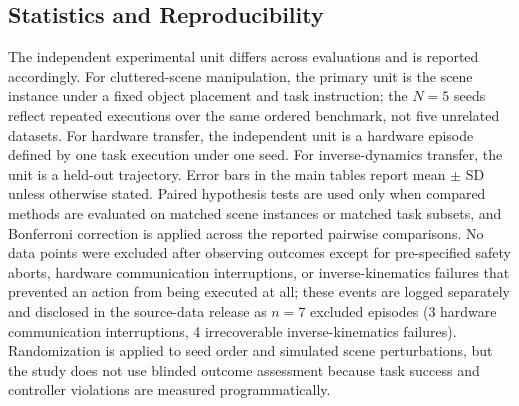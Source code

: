 \documentclass[12pt]{article}
\begin{document}
\begin{table}[!htbp]
\centering
\caption{Computational cost comparison (inference on NVIDIA RTX 4090).}
\label{tab:compute}
\small\setlength{\tabcolsep}{3pt}
\end{table}

\subsection{Statistics and Reproducibility}

The independent experimental unit differs across evaluations and is reported accordingly. For cluttered-scene manipulation, the primary unit is the scene instance under a fixed object placement and task instruction; the $N=5$ seeds reflect repeated executions over the same ordered benchmark, not five unrelated datasets. For hardware transfer, the independent unit is a hardware episode defined by one task execution under one seed. For inverse-dynamics transfer, the unit is a held-out trajectory. Error bars in the main tables report mean $\pm$ SD unless otherwise stated. Paired hypothesis tests are used only when compared methods are evaluated on matched scene instances or matched task subsets, and Bonferroni correction is applied across the reported pairwise comparisons. No data points were excluded after observing outcomes except for pre-specified safety aborts, hardware communication interruptions, or inverse-kinematics failures that prevented an action from being executed at all; these events are logged separately and disclosed in the source-data release as $n=7$ excluded episodes (3 hardware communication interruptions, 4 irrecoverable inverse-kinematics failures). Randomization is applied to seed order and simulated scene perturbations, but the study does not use blinded outcome assessment because task success and controller violations are measured programmatically.
\end{document}
